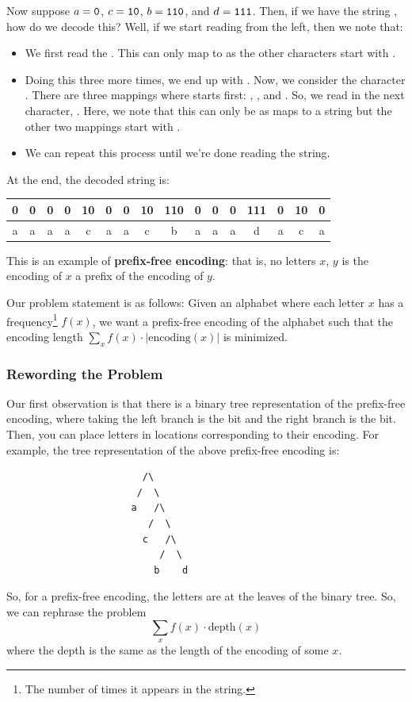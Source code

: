 \documentclass[letterpaper]{article}
\begin{document}
Now suppose $a = \texttt{0}$, $c = \texttt{10}$, $b = \texttt{110}$, and $d = \texttt{111}$. Then, if we have the string , how do we decode this? Well, if we start reading from the left, then we note that: 
\begin{itemize}
    \item We first read the . This can only map to  as the other characters start with .
    \item Doing this three more times, we end up with . Now, we consider the character . There are three mappings where  starts first: , , and . So, we read in the next character, . Here, we note that this can only be  as  maps to a string  but the other two mappings start with . 
    \item We can repeat this process until we're done reading the string.
\end{itemize}
At the end, the decoded string is: 
\begin{center}
    \begin{tabular}{c c c c c c c c c c c c c c c c}
        0 & 0 & 0 & 0 & 10 & 0 & 0 & 10 & 110 & 0 & 0 & 0 & 111 & 0 & 10 & 0 \\ 
        \hline 
        a & a & a & a & c  & a & a & c  & b   & a & a & a & d   & a & c  & a
    \end{tabular}
\end{center}
This is an example of \textbf{prefix-free encoding}: that is, no letters $x$, $y$ is the encoding of $x$ a prefix of the encoding of $y$. 

\bigskip 

Our problem statement is as follows: Given an alphabet where each letter $x$ has a frequency\footnote{The number of times it appears in the string.} $f(x)$, we want a prefix-free encoding of the alphabet such that the encoding length $\sum_{x} f(x) \cdot |\text{encoding}(x)|$ is minimized.


\subsubsection{Rewording the Problem}
Our first observation is that there is a binary tree representation of the prefix-free encoding, where taking the left branch is the  bit and the right branch is the  bit. Then, you can place letters in locations corresponding to their encoding. For example, the tree representation of the above prefix-free encoding is: 
\begin{verbatim}
                        /\
                       /  \ 
                      a   /\ 
                         /  \ 
                        c   /\ 
                           /  \ 
                          b    d 
\end{verbatim} 
So, for a prefix-free encoding, the letters are at the leaves of the binary tree. So, we can rephrase the problem
\[\sum_x f(x) \cdot \text{depth}(x)\]
where the depth is the same as the length of the encoding of some $x$. 
\end{document}
